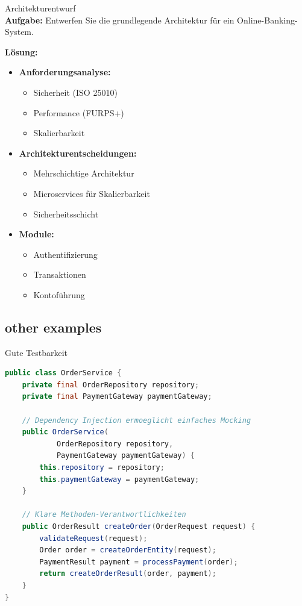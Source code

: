 \begin{example2}{Architekturentwurf}\\
\textbf{Aufgabe:} Entwerfen Sie die grundlegende Architektur für ein Online-Banking-System.

\textbf{Lösung:}
\begin{itemize}
    \item \textbf{Anforderungsanalyse:}
    \begin{itemize}
        \item Sicherheit (ISO 25010)
        \item Performance (FURPS+)
        \item Skalierbarkeit
    \end{itemize}
    
    \item \textbf{Architekturentscheidungen:}
    \begin{itemize}
        \item Mehrschichtige Architektur
        \item Microservices für Skalierbarkeit
        \item Sicherheitsschicht
    \end{itemize}
    
    \item \textbf{Module:}
    \begin{itemize}
        \item Authentifizierung
        \item Transaktionen
        \item Kontoführung
    \end{itemize}
\end{itemize}
\end{example2}

\subsection{other examples}

\begin{example2}{Gute Testbarkeit}\\

\begin{lstlisting}[language=Java, style=basesmol]
public class OrderService {
    private final OrderRepository repository;
    private final PaymentGateway paymentGateway;
    
    // Dependency Injection ermoeglicht einfaches Mocking
    public OrderService(
            OrderRepository repository,
            PaymentGateway paymentGateway) {
        this.repository = repository;
        this.paymentGateway = paymentGateway;
    }
    
    // Klare Methoden-Verantwortlichkeiten
    public OrderResult createOrder(OrderRequest request) {
        validateRequest(request);
        Order order = createOrderEntity(request);
        PaymentResult payment = processPayment(order);
        return createOrderResult(order, payment);
    }
}
\end{lstlisting}
\end{example2}

